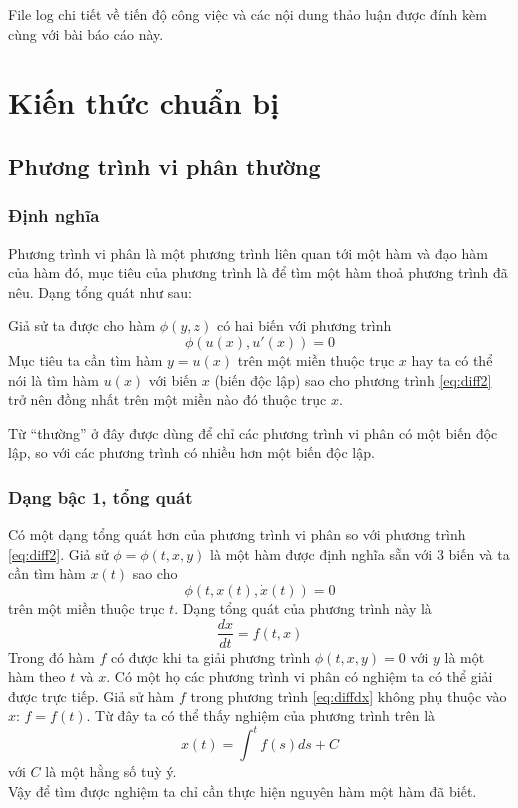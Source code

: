 \documentclass[a4paper]{article}
\begin{document}
File log chi tiết về tiến độ công việc và các nội dung thảo luận được đính kèm cùng với bài báo cáo này.
\newpage
\section{Kiến thức chuẩn bị}
\subsection{Phương trình vi phân thường}
\label{sec:ODE}
\subsubsection{Định nghĩa}
Phương trình vi phân là một phương trình liên quan tới một hàm và đạo hàm của hàm đó, mục tiêu của phương trình là để tìm một hàm thoả phương trình đã nêu. Dạng tổng quát như sau: \par
Giả sử ta được cho hàm $\phi(y,z)$ có hai biến với phương trình 
\begin{equation}\label{eq:diff2}
    \phi(u(x), u'(x)) = 0
\end{equation} 
Mục tiêu ta cần tìm hàm $y = u(x)$ trên một miền thuộc trục $x$ hay ta có thể nói là tìm hàm $u(x)$ với biến $x$ (biến độc lập) sao cho phương trình \eqref{eq:diff2} trở nên đồng nhất trên một miền nào đó thuộc trục $x$. \par
Từ “thường” ở đây được dùng để chỉ các phương trình vi phân có một biến độc lập, so với các phương trình có nhiều hơn một biến độc lập.
\subsubsection{Dạng bậc 1, tổng quát}
Có một dạng tổng quát hơn của phương trình vi phân so với phương trình \eqref{eq:diff2}. Giả sử $\phi = \phi(t,x,y)$ là một hàm được định nghĩa sẵn với 3 biến và ta cần tìm hàm $x(t)$ sao cho
\begin{equation}\label{eq:diffstd}
    \phi(t, x(t), \dot{x}(t)) = 0
\end{equation} 
trên một miền thuộc trục $t$. Dạng tổng quát của phương trình này là
\begin{equation}\label{eq:diffdx}
    \dfrac{dx}{dt} = f(t,x)
\end{equation} 
Trong đó hàm $f$ có được khi ta giải phương trình $\phi(t,x,y) = 0$ với $y$ là một hàm theo $t$ và $x$.
Có một họ các phương trình vi phân có nghiệm ta có thể giải được trực tiếp. Giả sử hàm $f$ trong phương trình \eqref{eq:diffdx} không phụ thuộc vào $x$: $f = f(t)$. Từ đây ta có thể thấy nghiệm của phương trình trên là 
\begin{equation}
    x(t) = \int^t{f(s)ds} + C
\end{equation} 
với $C$ là một hằng số tuỳ ý. \\
Vậy để tìm được nghiệm ta chỉ cần thực hiện nguyên hàm một hàm đã biết.
\end{document}

